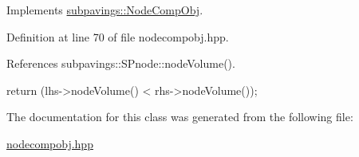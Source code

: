 \-Implements \hyperlink{classsubpavings_1_1NodeCompObj_a121d53049c5ed1c0924313951d6aa630}{subpavings\-::\-Node\-Comp\-Obj}.



\-Definition at line 70 of file nodecompobj.\-hpp.



\-References subpavings\-::\-S\-Pnode\-::node\-Volume().


\begin{DoxyCode}
        { return (lhs->nodeVolume() < rhs->nodeVolume()); }
\end{DoxyCode}


\-The documentation for this class was generated from the following file\-:\begin{DoxyCompactItemize}
\item 
\hyperlink{nodecompobj_8hpp}{nodecompobj.\-hpp}\end{DoxyCompactItemize}

